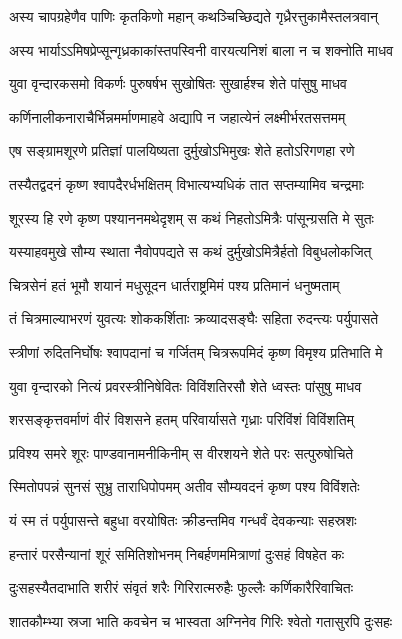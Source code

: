 \twolineshloka
{अस्य चापग्रहेणैव पाणिः कृतकिणो महान्}
{कथञ्चिच्छिद्यते गृध्रैरत्तुकामैस्तलत्रवान्}


\twolineshloka
{अस्य भार्याऽऽमिषप्रेप्सून्गृध्रकाकांस्तपस्विनी}
{वारयत्यनिशं बाला न च शक्नोति माधव}


\twolineshloka
{युवा वृन्दारकसमो विकर्णः पुरुषर्षभ}
{सुखोषितः सुखार्हश्च शेते पांसुषु माधव}


\twolineshloka
{कर्णिनालीकनाराचैर्भिन्नमर्माणमाहवे}
{अद्यापि न जहात्येनं लक्ष्मीर्भरतसत्तमम्}


\twolineshloka
{एष सङ्ग्रामशूरणे प्रतिज्ञां पालयिष्यता}
{दुर्मुखोऽभिमुखः शेते हतोऽरिगणहा रणे}


\twolineshloka
{तस्यैतद्वदनं कृष्ण श्वापदैरर्धभक्षितम्}
{विभात्यभ्यधिकं तात सप्तम्यामिव चन्द्रमाः}


\twolineshloka
{शूरस्य हि रणे कृष्ण पश्याननमथेदृशम्}
{स कथं निहतोऽमित्रैः पांसून्ग्रसति मे सुतः}


\twolineshloka
{यस्याहवमुखे सौम्य स्थाता नैवोपपद्यते}
{स कथं दुर्मुखोऽमित्रैर्हतो विबुधलोकजित्}


\twolineshloka
{चित्रसेनं हतं भूमौ शयानं मधुसूदन}
{धार्तराष्ट्रमिमं पश्य प्रतिमानं धनुष्मताम्}


\twolineshloka
{तं चित्रमाल्याभरणं युवत्यः शोककर्शिताः}
{क्रव्यादसङ्घैः सहिता रुदन्त्यः पर्युपासते}


\twolineshloka
{स्त्रीणां रुदितनिर्घोषः श्वापदानां च गर्जितम्}
{चित्ररूपमिदं कृष्ण विमृश्य प्रतिभाति मे}


\twolineshloka
{युवा वृन्दारको नित्यं प्रवरस्त्रीनिषेवितः}
{विविंशतिरसौ शेते ध्वस्तः पांसुषु माधव}


\twolineshloka
{शरसङ्कृत्तवर्माणं वीरं विशसने हतम्}
{परिवार्यासते गृध्राः परिविंशं विविंशतिम्}


\twolineshloka
{प्रविश्य समरे शूरः पाण्डवानामनीकिनीम्}
{स वीरशयने शेते परः सत्पुरुषोचिते}


\twolineshloka
{स्मितोपपन्नं सुनसं सुभ्रु ताराधिपोपमम्}
{अतीव सौम्यवदनं कृष्ण पश्य विविंशतेः}


\twolineshloka
{यं स्म तं पर्युपासन्ते बहुधा वरयोषितः}
{क्रीडन्तमिव गन्धर्वं देवकन्याः सहस्रशः}


\twolineshloka
{हन्तारं परसैन्यानां शूरं समितिशोभनम्}
{निबर्हणममित्राणां दुःसहं विषहेत कः}


\twolineshloka
{दुःसहस्यैतदाभाति शरीरं संवृतं शरैः}
{गिरिरात्मरुहैः फुल्लैः कर्णिकारैरिवाचितः}


\twolineshloka
{शातकौम्भ्या स्रजा भाति कवचेन च भास्वता}
{अग्निनेव गिरिः श्वेतो गतासुरपि दुःसहः}


